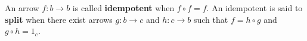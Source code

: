 An arrow $f: b \rightarrow b$ is called \textbf{idempotent} when $f \circ f = f$. An idempotent is said to \textbf{split} when there exist arrows $g: b \rightarrow c$ and $h: c \rightarrow b$ such that $f = h \circ g$ and $g \circ h = 1_c$.